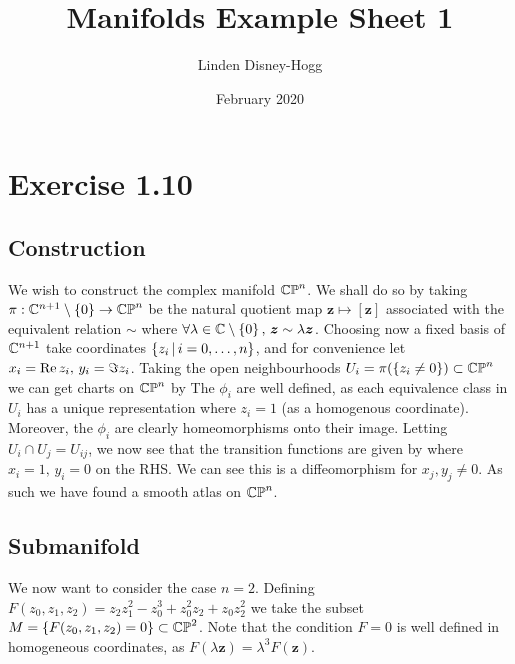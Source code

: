 \documentclass{article}
\title{Manifolds Example Sheet 1}
\author{Linden Disney-Hogg}
\date{February 2020}
\begin{document}
\maketitle
\tableofcontents

\section{Exercise 1.10}
\subsection{Construction}
We wish to construct the complex manifold $\mathbb{CP}^{n}$. We shall do so by taking $\pi : \mathbb{C}^{n+1}\setminus\left\{ 0 \right\} \to \mathbb{CP}^n $ be the natural quotient map $\bm{z} \mapsto [\bm{z}]$ associated with the equivalent relation $\sim$ where $\forall \lambda \in \mathbb{C}\setminus\left\{ 0 \right\}, \, \bm{z} \sim \lambda \bm{z}$. Choosing now a fixed basis of $\mathbb{C}^{n+1}$ take coordinates $\left\{ z_i \, | \, i=0, \dots, n \right\}$, and for convenience let $x_i = \operatorname{Re} z_i,\, y_i = \Im z_i$. Taking the open neighbourhoods $U_i = \pi(\left\{ z_i \neq 0 \right\}) \subset \mathbb{CP}^{n}$ we can get charts on $\mathbb{CP}^n$ by 
The $\phi_i$ are well defined, as each equivalence class in $U_i$ has a unique representation where $z_i = 1$ (as a homogenous coordinate). Moreover, the $\phi_i$ are clearly homeomorphisms onto their image. Letting $U_i \cap U_j = U_{ij}$, we now see that the transition functions are given by 
where $x_i = 1, \, y_i = 0$ on the RHS. We can see this is a diffeomorphism for $x_j, y_j \neq 0$. As such we have found a smooth atlas on $\mathbb{CP}^n$.  

\subsection{Submanifold}
We now want to consider the case $n=2$. Defining $F(z_0,z_1,z_2) = z_2 z_1^2 - z_0^3 + z_0^2 z_2 + z_0 z_2^2$ we take the subset $M = \left\{ F(z_0,z_1,z_2) = 0 \right\} \subset \mathbb{CP}^2$. Note that the condition $F = 0$ is well defined in homogeneous coordinates, as $F(\lambda \bm{z}) = \lambda^3 F(\bm{z})$. 
\end{document}
